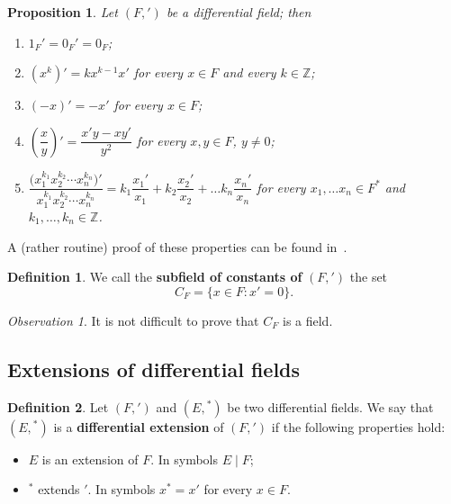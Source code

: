 \documentclass[11pt]{article}
\theoremstyle{plain}
\newtheorem{proposition}{Proposition}
\theoremstyle{definition}
\newtheorem{definition}{Definition}
\theoremstyle{remark}
\newtheorem*{observation}{Observation}
\newcommand{\Z}{\mathbb{Z}}
\begin{document}
\begin{proposition}\label{prop:derivrules}
Let $(F, ')$ be a differential field; then
\begin{enumerate}
\item $1_{F}' = 0_{F}' = 0_{F}$;
\item $(x^{k})' = k x^{k-1} x'$ for every $x \in F$ and every
$k \in \Z$;
\item $(-x)' = -x'$ for every $x \in F$;
\item $\left( \dfrac{x}{y} \right)' = \dfrac{x' y - x y'}{y^{2}}$ for
every $x, y \in F$, $y \neq 0$;
\item $\dfrac{\bigl(x_{1}^{k_{1}} x_{2}^{k_{2}} \cdots
x_{n}^{k_{n}}\bigr)'}{x_{1}^{k_{1}} x_{2}^{k_{2}} \cdots x_{n}^{k_{n}}}
= k_{1} \dfrac{x_{1}'}{x_{1}} + k_{2} \dfrac{x_{2}'}{x_{2}}
+ \ldots k_{n} \dfrac{x_{n}'}{x_{n}}$ for every
$x_{1}, \ldots x_{n} \in F^{*}$ and $k_{1}, \ldots, k_{n} \in \Z$.
\end{enumerate}
\end{proposition}

A (rather routine) proof of these properties can be found
in~\cite{DeLellis}.

\begin{definition}\label{def:constants}
We call the \textbf{subfield of constants of} $(F, ')$ the set
\[
C_{F} = \{ x \in F : x' = 0 \}.
\]
\end{definition}

\begin{observation}
It is not difficult to prove that $C_{F}$ is a field.
\end{observation}

\subsection*{Extensions of differential fields}

\begin{definition}\label{def:diffext}
Let $(F, ')$ and $(E, {}^{*})$ be two differential fields. We say that
$(E, {}^{*})$ is a \textbf{differential extension} of $(F, ')$ if the
following properties hold:
\begin{itemize}
\item[(i)] $E$ is an extension of $F$. In symbols $E\mid F$;
\item[(ii)] ${}^{*}$ extends $'$. In symbols $x^{*} = x'$ for every
$x \in F$.
\end{itemize}
\end{definition}
\end{document}

